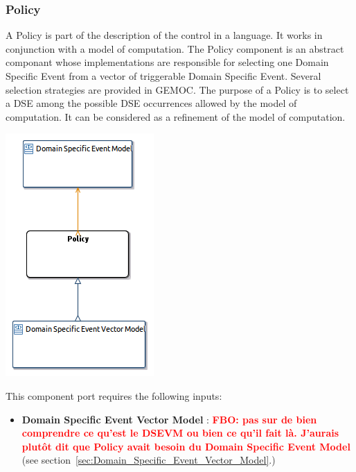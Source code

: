 \documentclass{gemoc} %
\begin{document}
\subsubsection{Policy}
\label{sec:Policy}
A Policy is part of the description of the control in a language. It works in conjunction with a model of computation.
The Policy component is an abstract componant whose implementations are responsible for selecting one Domain Specific Event from a vector of triggerable Domain Specific Event. Several selection strategies are provided in GEMOC.
The purpose of a Policy is to select a DSE among the possible DSE occurrences allowed by the model of computation. It can be considered as a refinement of the model of computation.
\begin{center}
\includegraphics*[trim=0.0cm 0.0cm 0cm 0.0cm, clip=true]{../images/generated/Generated_Policy.png}
\end{center}

This component port requires the following inputs:
\begin{itemize}
  \item \textbf{Domain Specific Event Vector Model} :
\textbf{\textcolor{red}{FBO: pas sur de bien comprendre ce qu'est le DSEVM ou bien ce qu'il fait l\`a. J'aurais plut\^ot dit que Policy avait besoin du Domain Specific Event Model}}
(see section~\ref{sec:Domain_Specific_Event_Vector_Model}.)
\end{itemize}
\end{document}
